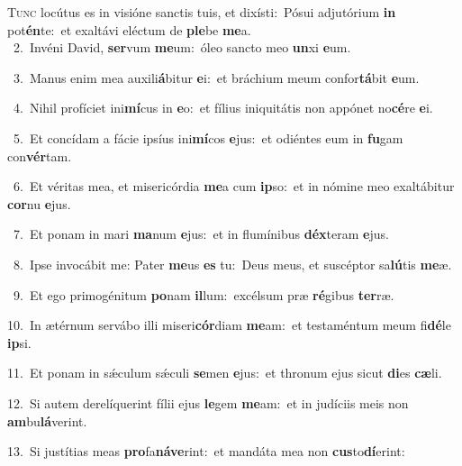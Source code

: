 \lettrine{\initial\textcolor{\initialcolor}{T}}{unc} locútus es in visióne sanctis tuis, et dixísti:~\dagger Pósui adjutórium \textbf{in} pot\-\textbf{én}\-te:~\star et exaltávi eléctum de \textbf{ple}\-be \textbf{me}\-a.\\
{\numbfont\textcolor{\numbcolor}{~2.}}~Invéni David, \textbf{ser}\-vum \textbf{me}\-um:~\star óleo sancto meo \textbf{un}\-xi \textbf{e}\-um.\par
{\numbfont\textcolor{\numbcolor}{~3.}}~Manus enim mea auxili\-\textbf{á}\-bitur \textbf{e}\-i:~\star et bráchium meum confor\-\textbf{tá}\-bit \textbf{e}\-um.\par
{\numbfont\textcolor{\numbcolor}{~4.}}~Nihil profíciet ini\-\textbf{mí}\-cus in \textbf{e}\-o:~\star et fílius iniquitátis non appónet no\-\textbf{cé}\-re \textbf{e}\-i.\par
{\numbfont\textcolor{\numbcolor}{~5.}}~Et concídam a fácie ipsíus ini\-\textbf{mí}\-cos \textbf{e}\-jus:~\star et odiéntes eum in \textbf{fu}\-gam con\-\textbf{vér}\-tam.\par
{\numbfont\textcolor{\numbcolor}{~6.}}~Et véritas mea, et misericórdia \textbf{me}\-a cum \textbf{ip}\-so:~\star et in nómine meo exaltábitur \textbf{cor}\-nu \textbf{e}\-jus.\par
{\numbfont\textcolor{\numbcolor}{~7.}}~Et ponam in mari \textbf{ma}\-num \textbf{e}\-jus:~\star et in flumínibus \textbf{déx}\-teram \textbf{e}\-jus.\par
{\numbfont\textcolor{\numbcolor}{~8.}}~Ipse invocábit me: Pater \textbf{me}\-us \textbf{es} tu:~\star Deus meus, et suscéptor sa\-\textbf{lú}\-tis \textbf{me}\-æ.\par
{\numbfont\textcolor{\numbcolor}{~9.}}~Et ego primogénitum \textbf{po}\-nam \textbf{il}\-lum:~\star excélsum præ \textbf{ré}\-gibus \textbf{ter}\-ræ.\par
{\numbfont\textcolor{\numbcolor}{10.}}~In ætérnum servábo illi miseri\-\textbf{cór}\-diam \textbf{me}\-am:~\star et testaméntum meum fi\-\textbf{dé}\-le \textbf{ip}\-si.\par
{\numbfont\textcolor{\numbcolor}{11.}}~Et ponam in sǽculum sǽculi \textbf{se}\-men \textbf{e}\-jus:~\star et thronum ejus sicut \textbf{di}\-es \textbf{cæ}\-li.\par
{\numbfont\textcolor{\numbcolor}{12.}}~Si autem derelíquerint fílii ejus \textbf{le}\-gem \textbf{me}\-am:~\star et in judíciis meis non \textbf{am}\-bu\-\textbf{lá}\-verint.\par
{\numbfont\textcolor{\numbcolor}{13.}}~Si justítias meas \textbf{pro}\-fa\-\textbf{ná}\-\textbf{ve}rint:~\star et mandáta mea non \textbf{cus}\-to\-\textbf{dí}\-erint:\par
